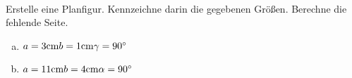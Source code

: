 \begin{aufgabe} ~ \\ 
Erstelle eine Planfigur. Kennzeichne darin die gegebenen Größen. Berechne die fehlende Seite.\begin{enumerate}[a)] 
\item 
$a=3 \mathrm{cm} \\b=1 \mathrm{cm} \\\gamma=90^{\circ} \\$
\item 
$a=11 \mathrm{cm} \\b=4 \mathrm{cm} \\\alpha=90^{\circ} \\$
\end{enumerate} 
\end{aufgabe} 
